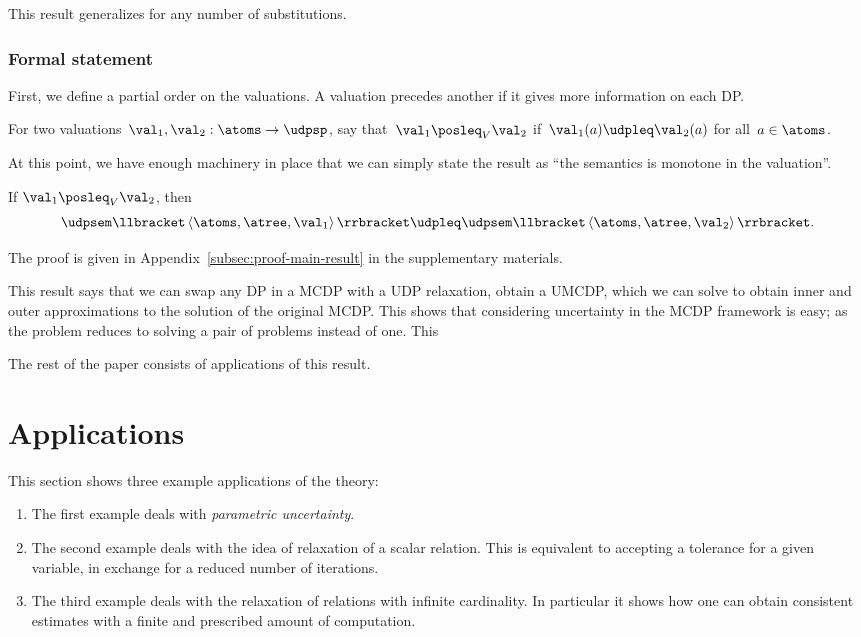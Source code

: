 This result generalizes for any number of substitutions.

\subsubsection*{Formal statement}

First, we define a partial order on the valuations. A valuation precedes
another if it gives more information on each DP.
\begin{definition}
  \label{def:For-two-valuations,}For two valuations~$\val_{1},\val_{2}:\atoms\rightarrow\udpsp$,
  say that~$\val_{1}\posleq_{V}\val_{2}$ if~$\val_{1}(a)\udpleq\val_{2}(a)$
  for all~$a\in\atoms$.
\end{definition}
At this point, we have enough machinery in place that we can simply
state the result as ``the semantics is monotone in the valuation''.
\begin{theorem}
  \label{thm:udpsem-monotone}If $\val_{1}\posleq_{V}\val_{2}$, then
  \[
    \udpsem\llbracket\left\langle \atoms,\atree,\val_{1}\right\rangle \rrbracket\udpleq\udpsem\llbracket\left\langle \atoms,\atree,\val_{2}\right\rangle \rrbracket.
  \]
\end{theorem}
The proof is given in Appendix~\cref{subsec:proof-main-result}
in the supplementary materials.

This result says that we can swap any DP in a MCDP with a UDP relaxation,
obtain a UMCDP, which we can solve to obtain inner and outer approximations
to the solution of the original MCDP. This shows that considering
uncertainty in the MCDP framework is easy; as the problem reduces
to solving a pair of problems instead of one. This

The rest of the paper consists of applications of this result.

\section{Applications\label{sec:Applications}}

This section shows three example applications of the theory:
\begin{enumerate}
  \item The first example deals with \emph{parametric uncertainty}.
  \item The second example deals with the idea of relaxation of a scalar relation.
  This is equivalent to accepting a tolerance for a given variable,
  in exchange for a reduced number of iterations.
  \item The third example deals with the relaxation of relations with infinite
  cardinality. In particular it shows how one can obtain consistent
  estimates with a finite and prescribed amount of computation.
\end{enumerate}

